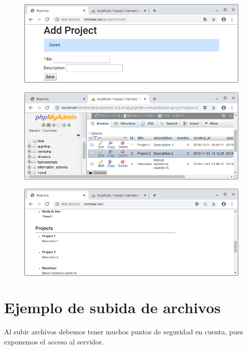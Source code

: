 \documentclass{article}
\begin{document}
\begin{figure}[h!]
  \centering
  \includegraphics[scale=0.5]{./Pictures/173_proj_saved_ok.png}
\end{figure}

\newpage

\begin{figure}[h!]
  \centering
  \includegraphics[scale=0.5]{./Pictures/174_proj_bd_ok.png}
\end{figure}

\begin{figure}[h!]
  \centering
  \includegraphics[scale=0.5]{./Pictures/175_proj_root_ok.png}
\end{figure}

\newpage

\section{Ejemplo de subida de archivos}%
Al subir archivos debemos tener muchos puntos de seguridad en cuenta, pues
exponemos el acceso al servidor.\\
\end{document}
